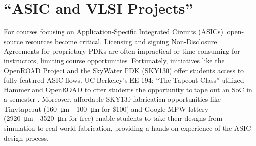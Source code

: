 \section{\enquote{ASIC and VLSI Projects}}

For courses focusing on Application-Specific Integrated Circuits (ASICs), open-source resources become critical.
Licensing and signing Non-Disclosure Agreements for proprietary PDKs are often impractical or time-consuming for instructors, limiting course opportunities.
Fortunately, initiatives like the OpenROAD Project and the SkyWater PDK (SKY130) offer students access to fully-featured ASIC flows.
UC Berkeley's EE 194: \enquote{The Tapeout Class} utilized Hammer and OpenROAD to offer students the opportunity to tape out an SoC in a semester \cite{ZhaoLatchUp}.
Moreover, affordable SKY130 fabrication opportunities like Tinytapeout (\SI{160}{\micro\metre}~\texttimes~\SI{100}{\micro\metre} for \$100) \cite{tinytapeoutTinyTapeout} and Google MPW lottery (\SI{2920}{\micro\metre}~\texttimes~\SI{3520}{\micro\metre} for free) \cite{efablessCaravel} enable students to take their designs from simulation to real-world fabrication, providing a hands-on experience of the ASIC design process.
